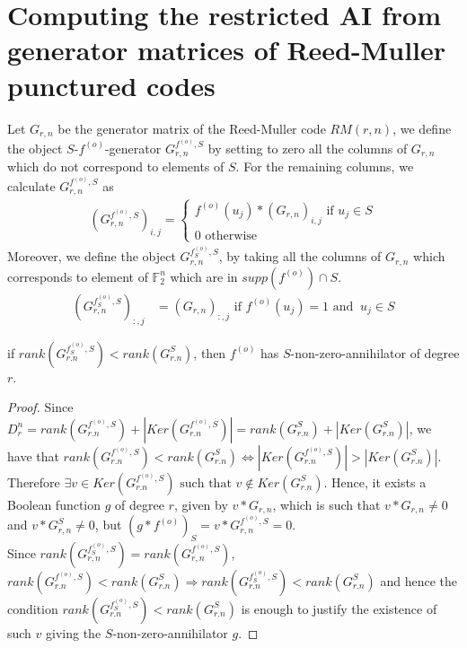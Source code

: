 \documentclass[11pt]{llncs}
\begin{document}
\section{Computing the restricted AI from generator matrices of Reed-Muller punctured codes}\label{sec:RMapproach}
\begin{definition}
	Let $G_{r,n}$ be the generator matrix of the Reed-Muller code $RM(r,n)$, we define the object $S$-$f^{(o)}$-generator $G_{r,n}^{f^{(o)},S}$ by setting to zero all the columns of $G_{r,n}$ which do not correspond to elements of $S$. For the remaining columns, we calculate $G_{r,n}^{f^{(o)},S}$ as
	\begin{align*}
	\left(G_{r,n}^{f^{(o)},S}\right)_{i,j} =
	\begin{cases}
	f^{(o)}(u_j)*\left(G_{r,n}\right)_{i,j} \mbox{ if }u_j \in S\\
	0 \mbox{ otherwise}
	\end{cases}
	\end{align*}
	Moreover, we define the object $G_{r,n}^{f^{(o)}_S,S}$, by taking all the columns of $G_{r,n}$ which corresponds to element of $\mathbb{F}_2^n$ which are in $supp\left(f^{(o)}\right) \cap S$.
	\begin{align}
	\left(G_{r,n}^{f_S^{(o)},S}\right)_{:,j}           & = (G_{r,n})_{:,j} \mbox{ if } f^{(o)}(u_j) = 1 \mbox{ and } \ u_j\in S \label{eq:f-generatorRestrictedSet}
	\end{align}
\end{definition}

\begin{proposition}\label{prop:compareranks}
	if $rank(G^{f_S^{(o)},S}_{r.n}) < rank(G^{S}_{r.n})$, then $f^{(o)}$ has $S$-non-zero-annihilator of degree $r$.
\end{proposition}
\begin{proof}
	Since $D_r^n = rank(G^{f^{(o)},S}_{r.n}) + |Ker(G^{f^{(o)},S}_{r.n})| =  rank(G^{S}_{r.n}) + |Ker(G^{S}_{r.n})|$, we have that
	$rank(G^{f^{(o)},S}_{r.n}) < rank(G^{S}_{r.n}) \iff |Ker(G^{f^{(o)},S}_{r.n})| > |Ker(G^{S}_{r.n})|$. Therefore $\exists v\in Ker(G^{f^{(o)},S}_{r.n}) \mbox{ such that }v\not\in Ker(G^{S}_{r.n})$. Hence, it exists a Boolean function $g$ of degree $r$, given by $v*G_{r,n}$, which is such that $v*G_{r,n}\neq 0$ and $v*G_{r,n}^{S}\neq 0$, but $(g*f^{(o)})_S = v*G_{r,n}^{f^{(o)},S} = 0$.\\
	Since $rank\left(G_{r,n}^{f_S^{(o)}, S}\right) = rank\left(G_{r,n}^{f^{(o)}, S}\right)$, $rank(G^{f^{(o)},S}_{r.n}) < rank(G^{S}_{r.n}) \Rightarrow rank(G^{f_S^{(o)},S}_{r.n}) < rank(G^{S}_{r.n})$ and hence the condition $rank(G^{f_S^{(o)},S}_{r.n}) < rank(G^{S}_{r.n})$ is enough to justify the existence of such $v$ giving the $S$-non-zero-annihilator $g$.
\end{proof}
\end{document}
